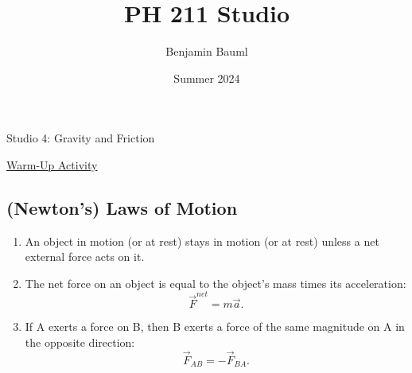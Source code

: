 \documentclass[]{article}
\title{PH 211 Studio \Week}
\author{Benjamin Bauml}
\date{Summer 2024}
\begin{document}
\begin{TeacherMargin}

\end{TeacherMargin}
\begin{PresentSpace}
\begin{center}
	\huge Studio 4: Gravity and Friction \\
	\vspace{1cm}
\end{center}
\underline{Warm-Up Activity} \\
\begin{comment}{2}
\begin{enumerate}[(A)]
	\item Velocity is acceleration times $t$.
	\vspace{6pt}
	\item Acceleration is velocity times $t$.
	\vspace{15pt}
	\item Acceleration is the derivative of velocity.
	\item Velocity is the derivative of acceleration.
\end{enumerate}
\end{comment}
\end{PresentSpace}
\newpage
\begin{TeacherMargin}

\end{TeacherMargin}
\begin{PresentSpace}
\vspace{-10pt}
\section*{(Newton's) Laws of Motion}
\vspace{-10pt}
\begin{enumerate}[(1)]
	\item An object in motion (or at rest) stays in motion (or at rest) unless a net external force acts on it.
	\item The net force on an object is equal to the object's mass times its acceleration:
	\[
	\vec{F}^{net} = m\vec{a}.
	\]
	\item If A exerts a force on B, then B exerts a force of the same magnitude on A in the opposite direction:
	\[
	\vec{F}_{AB} = -\vec{F}_{BA}.
	\]
\end{enumerate}
\end{PresentSpace}
\end{document}
